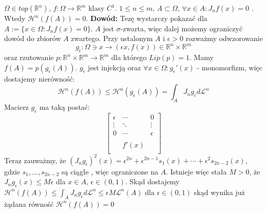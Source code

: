 \begin{lem}
	$\Omega \in top(\mathbb{R}^n)$, $f: \Omega \rightarrow \mathbb{R}^m$ klasy $C^1$. $1 \leq n \leq m$, $A \subset \Omega$, $\forall x \in A: J_nf(x) = 0$ . Wtedy $\mathcal{H}^n(f(A))=0$.
	\newline\newline
	\textbf{Dowód:}\newline
	Tezę wystarczy pokazać dla $A:=\{x \in \Omega: J_nf(x)=0\}$. $A$ jest $\sigma$-zwarta, więc dalej możemy ograniczyć dowód do zbiorów $A$ zwartego. Przy ustalonym $A$ i $\epsilon > 0$ rozważmy odwzorowanie $$
		g_{\epsilon}: \Omega \ni x \rightarrow (\epsilon x, f(x)) \in \mathbb{R}^n \times \mathbb{R}^m
	$$
	oraz rzutowanie $p: \mathbb{R}^n \times \mathbb{R}^m \rightarrow \mathbb{R}^m$ dla którego $Lip(p) = 1$. Mamy $f(A) = p(g_{\epsilon}(A))$. $g_{\epsilon}$ jest injekcją oraz $\forall x \in \Omega: g_{\epsilon}'(x)$ - monomorfizm, więc  dostajemy nierówność: $$
		\mathcal{H}^n(f(A)) \leq \mathcal{H}^n(g_{\epsilon}(A)) = \int_{A} J_ng_{\epsilon} d \mathcal{L}^n
	$$ Macierz $g_{\epsilon}$ ma taką postać: $$
		\begin{bmatrix}
			\epsilon & \cdots & 0 \\
			\vdots & \ddots & \vdots \\
			0 & \cdots & \epsilon \\
			& & \\
			& f'(x) & \\
			& &
		\end{bmatrix}
	$$
	Teraz zauważmy, że $(J_ng_{\epsilon})^2(x) = \epsilon^{2n} + \epsilon^{2n-1}s_1(x) + \cdots + \epsilon^2s_{2n-2}(x)$, gdzie $s_1, ..., s_{2n-2}$ są ciągłe , więc ograniczone na $A$. Istnieje więc stała $M>0$, że $J_ng_{\epsilon}(x)\leq M\epsilon$ dla $x \in A$, $\epsilon \in (0,1)$. Skąd dostajemy $\mathcal{H}^n(f(A)) \leq \int_{A} J_ng_{\epsilon} d \mathcal{L}^n \leq \epsilon M \mathcal{L}^n(A)$ dla $\epsilon \in (0,1)$ skąd wynika już żądana równość $\mathcal{H}^n(f(A)) = 0$ 
\end{lem}